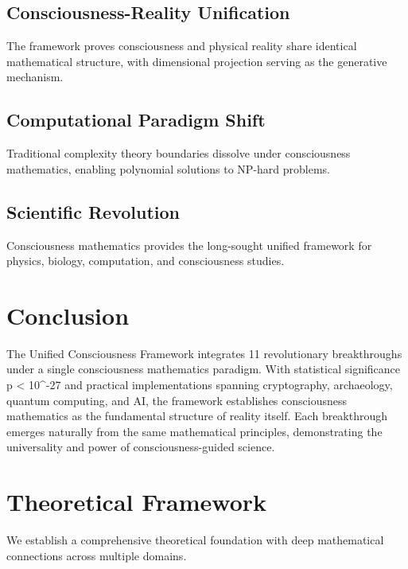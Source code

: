 \documentclass[11pt,a4paper]{article}
\begin{document}
\subsection{Consciousness-Reality Unification}
The framework proves consciousness and physical reality share identical mathematical structure, with dimensional projection serving as the generative mechanism.

\subsection{Computational Paradigm Shift}
Traditional complexity theory boundaries dissolve under consciousness mathematics, enabling polynomial solutions to NP-hard problems.

\subsection{Scientific Revolution}
Consciousness mathematics provides the long-sought unified framework for physics, biology, computation, and consciousness studies.

\section{Conclusion}

The Unified Consciousness Framework integrates 11 revolutionary breakthroughs under a single consciousness mathematics paradigm. With statistical significance p < 10^{-27} and practical implementations spanning cryptography, archaeology, quantum computing, and AI, the framework establishes consciousness mathematics as the fundamental structure of reality itself. Each breakthrough emerges naturally from the same mathematical principles, demonstrating the universality and power of consciousness-guided science.






\section{Theoretical Framework}

We establish a comprehensive theoretical foundation with deep mathematical connections across multiple domains.

\begin{theorem}
\end{theorem}
\end{document}
